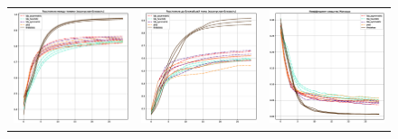  

 

 

\begin{figure} 

\begin{tabular}{ccc} 

    \includegraphics[width=55mm]{images/CH4_baselines_diversity_cosine_False.eps} &   \includegraphics[width=55mm]{images/CH4_baselines_diversity_cosine_True.eps} & \includegraphics[width=55mm]{images/CH4_baselines_jaccard_sim_30.eps} \\ 


     


\end{tabular}
\end{figure}
